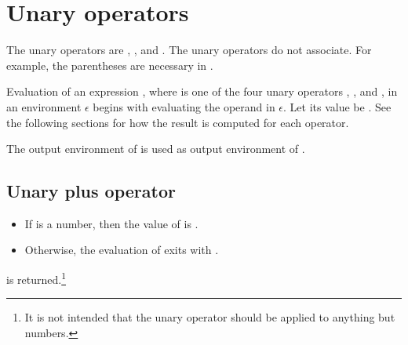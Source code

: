 \ifStd{}\fi
{}
\ifStd{}\fi
{}

\section{Unary operators}

\label{section:unary}

The unary operators are \T{+}, \T{-},  and .
The unary operators do not associate.  For example, the
parentheses are necessary in .

\SYNTAX

\begin{rules}
       {  \OR
        }

\end{rules}

\EVALUATION

Evaluation of an expression , where  is
one of the four unary operators \TXT{+}, \TXT{-},
 and , in an environment $\epsilon$ begins with evaluating
the operand  in $\epsilon$.  Let its value be .
See the following sections for how the result is computed for each
operator.

\ENVIRONMENTS

The output environment of  is used as output environment of
.

\subsection{Unary plus operator \T{+}}

\label{section:unaryplus}

\ifStd
\begin{itemize}
\item If  is a number, then the value of  is .
\item Otherwise, the evaluation of  exits with \T{\badarith}.
\end{itemize}
\fi
\ifOld
{} is returned.\footnote{It is not intended that the unary \T{+} operator
should be applied to anything but numbers.}
\fi
{}


